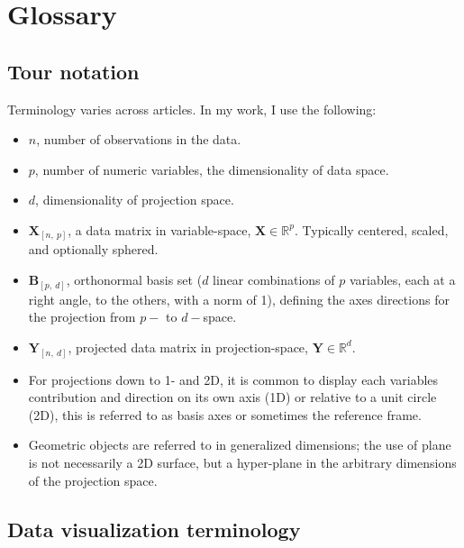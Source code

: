 \documentclass{monashthesis}
\begin{document}
\chapter{Glossary}\label{ch:glossary}

\section{Tour notation}\label{sec:tour_notation}

Terminology varies across articles. In my work, I use the following:

\begin{itemize}
\tightlist
\item
  \(n\), number of observations in the data.
\item
  \(p\), number of numeric variables, the dimensionality of data space.
\item
  \(d\), dimensionality of projection space.
\item
  \(\textbf{X}_{[n,~p]}\), a data matrix in variable-space,
  \(\textbf{X} \in \mathbb{R}^{p}\). Typically centered, scaled, and
  optionally sphered.
\item
  \(\textbf{B}_{[p,~d]}\), orthonormal basis set (\(d\) linear
  combinations of \(p\) variables, each at a right angle, to the others,
  with a norm of 1), defining the axes directions for the projection
  from \(p-\) to \(d-\)space.
\item
  \(\textbf{Y}_{[n,~d]}\), projected data matrix in projection-space,
  \(\textbf{Y} \in \mathbb{R}^{d}\).
\item
  For projections down to 1- and 2D, it is common to display each
  variables contribution and direction on its own axis (1D) or relative
  to a unit circle (2D), this is referred to as basis axes or sometimes
  the reference frame.
\item
  Geometric objects are referred to in generalized dimensions; the use
  of plane is not necessarily a 2D surface, but a hyper-plane in the
  arbitrary dimensions of the projection space.
\end{itemize}

\section{Data visualization terminology}\label{sec:3d-terminology}
\end{document}
